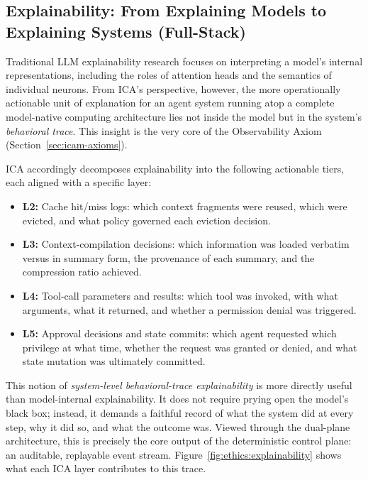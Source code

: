 \subsection{Explainability: From Explaining Models to Explaining Systems (Full-Stack)}
\label{sec:ethics-explainability}

Traditional LLM explainability research focuses on interpreting a model's internal representations, including the roles of attention heads and the semantics of individual neurons.  From ICA's perspective, however, the more operationally actionable unit of explanation for an agent system running atop a complete model-native computing architecture lies not inside the model but in the system's \emph{behavioral trace}.  This insight is the very core of the Observability Axiom (Section~\ref{sec:icam-axioms}).

ICA accordingly decomposes explainability into the following actionable tiers, each aligned with a specific layer:

\begin{itemize}[nosep]
\item \textbf{L2:} Cache hit/miss logs: which context fragments were reused, which were evicted, and what policy governed each eviction decision.
\item \textbf{L3:} Context-compilation decisions: which information was loaded verbatim versus in summary form, the provenance of each summary, and the compression ratio achieved.
\item \textbf{L4:} Tool-call parameters and results: which tool was invoked, with what arguments, what it returned, and whether a permission denial was triggered.
\item \textbf{L5:} Approval decisions and state commits: which agent requested which privilege at what time, whether the request was granted or denied, and what state mutation was ultimately committed.
\end{itemize}

This notion of \emph{system-level behavioral-trace explainability} is more directly useful than model-internal explainability.  It does not require prying open the model's black box; instead, it demands a faithful record of what the system did at every step, why it did so, and what the outcome was.  Viewed through the dual-plane architecture, this is precisely the core output of the deterministic control plane: an auditable, replayable event stream.
Figure~\ref{fig:ethics:explainability} shows what each ICA layer contributes to this trace.


